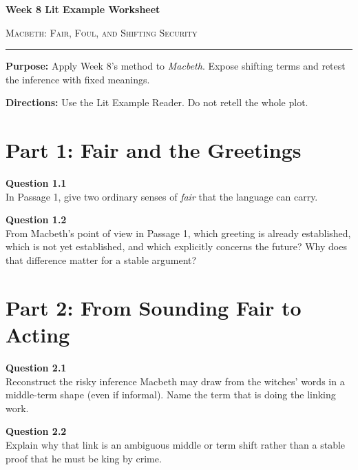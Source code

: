 \documentclass[12pt]{article}
\begin{document}
\begin{center}
{\LARGE\bfseries Week 8 Lit Example Worksheet}\par\vspace{0.05em}
{\large\scshape Macbeth: Fair, Foul, and Shifting Security}\par\vspace{0.12em}
\rule{0.78\textwidth}{0.5pt}
\end{center}

\textbf{Purpose:} Apply Week 8's method to \textit{Macbeth}. Expose shifting terms and retest the inference with fixed meanings.

\textbf{Directions:} Use the Lit Example Reader. Do not retell the whole plot.

\section*{Part 1: Fair and the Greetings}

\textbf{Question 1.1}\\[-0.15em]
In Passage 1, give two ordinary senses of \textit{fair} that the language can carry.


\textbf{Question 1.2}\\[-0.15em]
From Macbeth's point of view in Passage 1, which greeting is already established, which is not yet established, and which explicitly concerns the future? Why does that difference matter for a stable argument?


\newpage

\section*{Part 2: From Sounding Fair to Acting}

\textbf{Question 2.1}\\[-0.15em]
Reconstruct the risky inference Macbeth may draw from the witches' words in a middle-term shape (even if informal). Name the term that is doing the linking work.


\textbf{Question 2.2}\\[-0.15em]
Explain why that link is an ambiguous middle or term shift rather than a stable proof that he must be king by crime.

\end{document}
